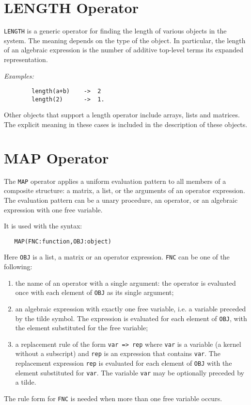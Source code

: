 \section{LENGTH Operator}
\hypertarget{operator:LENGTH}{}
\texttt{LENGTH} is a generic operator for finding the
length of various objects in the system.  The meaning depends on the type
of the object.  In particular, the length of an algebraic expression is
the number of additive top-level terms its expanded representation.

\textit{Examples:}
\begin{verbatim}
        length(a+b)    ->  2
        length(2)      ->  1.
\end{verbatim}
Other objects that support a length operator include arrays, lists and
matrices. The explicit meaning in these cases is included in the description
of these objects.



\section{MAP Operator}
\hypertarget{operator:MAP}{}

The \texttt{MAP} operator applies a uniform evaluation pattern to all members
of a composite structure: a matrix, a list, or the arguments of an
operator expression.  The evaluation pattern can be a unary procedure, an
operator, or an algebraic expression with one free variable.

It is used with the syntax:
\begin{verbatim}
   MAP(FNC:function,OBJ:object)
\end{verbatim}
Here \texttt{OBJ} is a list, a matrix or an operator expression.
\texttt{FNC} can be one of the following:
\begin{enumerate}
\item the name of an operator with a single argument: the operator
is evaluated once with each element of \texttt{OBJ} as its single argument;
\item an algebraic expression with exactly one free variable, i.e.
a variable preceded by the tilde symbol. The expression
is evaluated for each element of \texttt{OBJ}, with the element
substituted for the free variable;
\item a replacement rule of the form \texttt{var => rep}
where \texttt{var} is a variable (a kernel without a subscript)
and \texttt{rep} is an expression that contains \texttt{var}.
The replacement expression \texttt{rep} is evaluated for each element of
\texttt{OBJ} with
the element substituted for  \texttt{var}. The variable \texttt{var} may be
optionally preceded by a tilde.
\end{enumerate}
The rule form  for \texttt{FNC} is needed when more than
one free variable occurs.

